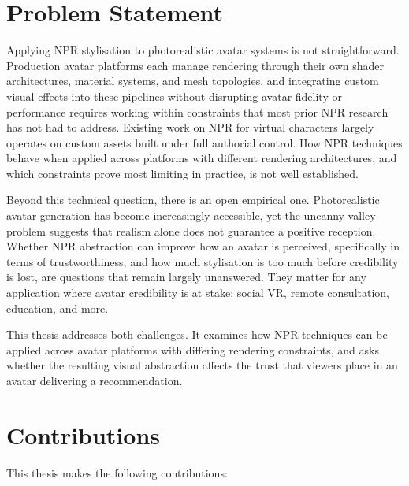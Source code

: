 \section{Problem Statement}
\label{sec:problem_statement}

Applying NPR stylisation to photorealistic avatar systems is not straightforward.
Production avatar platforms each manage rendering through their own shader architectures, material systems, and mesh topologies, and integrating custom visual effects into these pipelines without disrupting avatar fidelity or performance requires working within constraints that most prior NPR research has not had to address.
Existing work on NPR for virtual characters largely operates on custom assets built under full authorial control.
How NPR techniques behave when applied across platforms with different rendering architectures, and which constraints prove most limiting in practice, is not well established.

Beyond this technical question, there is an open empirical one.
Photorealistic avatar generation has become increasingly accessible, yet the uncanny valley problem suggests that realism alone does not guarantee a positive reception.
Whether NPR abstraction can improve how an avatar is perceived, specifically in terms of trustworthiness, and how much stylisation is too much before credibility is lost, are questions that remain largely unanswered.
They matter for any application where avatar credibility is at stake: social VR, remote consultation, education, and more.

This thesis addresses both challenges.
It examines how NPR techniques can be applied across avatar platforms with differing rendering constraints, and asks whether the resulting visual abstraction affects the trust that viewers place in an avatar delivering a recommendation.

\section{Contributions}
\label{sec:contributions}

This thesis makes the following contributions:

